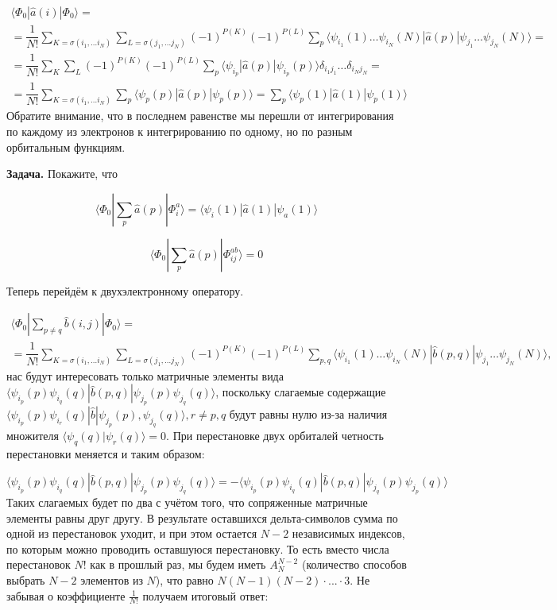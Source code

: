 \documentclass[12pt, oneside]{article}
\numberwithin{equation}{section}  %
\begin{document}
\begin{multline}
\langle \Phi_0 | \hat{a}(i) |\Phi_0 \rangle =\\= \dfrac{1}{N!} \sum_{K = \sigma(i_1, \dots i_N)} \sum_{L = \sigma(j_1, \dots j_N)} (-1)^{P(K)} (-1) ^ {P(L)} \sum_p \langle \psi_{i_1} (1) \dots \psi_{i_N} (N) | \hat{a} (p) | \psi_{j_1} \dots \psi_{j_N} (N) \rangle =\\=
 \dfrac{1}{N!} \sum_{K} \sum_{L} (-1) ^{P(K)} (-1) ^ {P(L)} \sum_p \langle \psi_{i_p} | \hat{a} (p) | \psi_{i_p} (p) \rangle \delta_{i_1 j_1} \dots \delta_{i_N j_N} =\\=
\dfrac{1}{N!} \sum_{K = \sigma(i_1, \dots i_N)} \sum_p \langle \psi_{p} (p) | \hat{a} (p) | \psi_{p} (p) \rangle = \sum_p \langle \psi_{p}(1) | \hat{a}(1) | \psi_{p}(1) \rangle
\end{multline}
Обратите внимание, что в последнем равенстве мы перешли от интегрирования по каждому из электронов к интегрированию по одному, но по разным орбитальным функциям.

\textbf{Задача.} Покажите, что

\[\langle \Phi_0 | \sum_p \hat{a} (p) | \Phi_i^a \rangle = \langle \psi_i (1) | \hat{a}(1) | \psi_a (1) \rangle\]

\[\langle \Phi_0 | \sum_p \hat{a} (p) | \Phi_{ij}^{ab} \rangle = 0\]

Теперь перейдём к двухэлектронному оператору.

\begin{multline}
\langle \Phi_0 | \sum_{p\neq q}\hat{b}(i, j) | \Phi_0 \rangle =\\= \dfrac{1}{N!} \sum_{K = \sigma(i_1, \dots i_N)} \sum_{L = \sigma(j_1, \dots j_N)} (-1)^{P(K)} (-1) ^ {P(L)} \sum_{p, q} \langle \psi_{i_1} (1) \dots \psi_{i_N} (N) | \hat{b} (p, q) | \psi_{j_1} \dots \psi_{j_N} (N) \rangle,
\end{multline}
нас будут интересовать только матричные элементы вида \(\langle \psi_{i_p} (p) \psi_{i_q} (q) | \hat{b} (p, q) | \psi_{j_p} (p) \psi_{j_q} (q) \rangle\), поскольку слагаемые содержащие \(\langle \psi_{i_p}(p) \psi_{i_r} (q) | \hat{b} | \psi_{j_p}(p), \psi_{j_q}(q) \rangle, r \neq p, q\) будут равны нулю из-за наличия множителя \(\langle \psi_q(q) | \psi_r (q) \rangle = 0\). При перестановке двух орбиталей четность перестановки меняется и таким образом:

\begin{equation}
\langle \psi_{i_p} (p) \psi_{i_q} (q) | \hat{b} (p, q) | \psi_{j_p} (p) \psi_{j_q} (q) \rangle = - \langle \psi_{i_p} (p) \psi_{i_q} (q) | \hat{b} (p, q) | \psi_{j_q} (p) \psi_{j_p} (q) \rangle
\end{equation}
Таких слагаемых будет по два с учётом того, что сопряженные матричные элементы равны друг другу. В результате оставшихся дельта-символов сумма по одной из перестановок уходит, и при этом остается \(N - 2\) независимых индексов, по которым можно проводить оставшуюся перестановку. То есть вместо числа перестановок \(N!\) как в прошлый раз, мы будем иметь \(A_{N}^{N-2}\) (количество способов выбрать \(N-2\) элементов из \(N\)), что равно \(N (N-1) (N-2) \cdot ... \cdot 3 \). Не забывая о коэффициенте \(\frac{1}{N!}\) получаем итоговый ответ:
\end{document}
